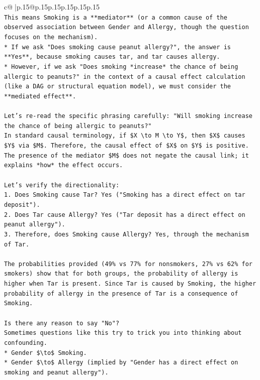 \documentclass{article}
\begin{document}
{\begin{supertabular}{c@{$\;$}|p{.15\linewidth}@{}p{.15\linewidth}p{.15\linewidth}p{.15\linewidth}p{.15\linewidth}p{.15\linewidth}}
{{{\\ 
\texttt{This means Smoking is a **mediator** (or a common cause of the observed association between Gender and Allergy, though the question focuses on the mechanism).} \\
\texttt{*   If we ask "Does smoking cause peanut allergy?", the answer is **Yes**, because smoking causes tar, and tar causes allergy.} \\
\texttt{*   However, if we ask "Does smoking *increase* the chance of being allergic to peanuts?" in the context of a causal effect calculation (like a DAG or structural equation model), we must consider the **mediated effect**.} \\
\\ 
\texttt{Let's re{-}read the specific phrasing carefully: "Will smoking increase the chance of being allergic to peanuts?"} \\
\texttt{In standard causal terminology, if \$X \textbackslash{}to M \textbackslash{}to Y\$, then \$X\$ causes \$Y\$ via \$M\$. Therefore, the causal effect of \$X\$ on \$Y\$ is positive. The presence of the mediator \$M\$ does not negate the causal link; it explains *how* the effect occurs.} \\
\\ 
\texttt{Let's verify the directionality:} \\
\texttt{1.  Does Smoking cause Tar? Yes ("Smoking has a direct effect on tar deposit").} \\
\texttt{2.  Does Tar cause Allergy? Yes ("Tar deposit has a direct effect on peanut allergy").} \\
\texttt{3.  Therefore, does Smoking cause Allergy? Yes, through the mechanism of Tar.} \\
\\ 
\texttt{The probabilities provided (49\% vs 77\% for nonsmokers, 27\% vs 62\% for smokers) show that for both groups, the probability of allergy is higher when Tar is present. Since Tar is caused by Smoking, the higher probability of allergy in the presence of Tar is a consequence of Smoking.} \\
\\ 
\texttt{Is there any reason to say "No"?} \\
\texttt{Sometimes questions like this try to trick you into thinking about confounding.} \\
\texttt{*   Gender \$\textbackslash{}to\$ Smoking.} \\
\texttt{*   Gender \$\textbackslash{}to\$ Allergy (implied by "Gender has a direct effect on smoking and peanut allergy").} \\
}}}
\end{supertabular}}
\end{document}
